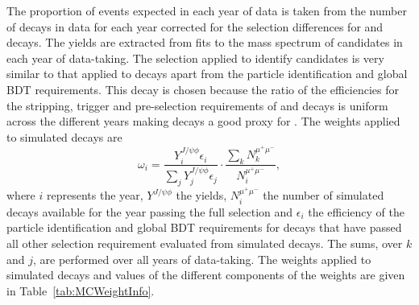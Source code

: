 The proportion of events expected in each year of data is taken from the number of \bsjpsiphi decays in data for each year corrected for the selection differences for \bsmumu and \bsjpsiphi decays. The \bsjpsiphi yields are extracted from fits to the mass spectrum of candidates in each year of data-taking. The selection applied to identify \bsjpsiphi candidates is very similar to that applied to \bsmumu decays apart from the particle identification and global BDT requirements. This decay is chosen because the ratio of the efficiencies for the stripping, trigger and pre-selection requirements of \bsmumu and \bsjpsiphi decays is uniform across the different years making \bsjpsiphi decays a good proxy for \bsmumu. 
The weights applied to simulated \bsmumu decays are
\begin{equation}
\omega_{i}  = \frac{Y_{i}^{J/\psi \phi} \epsilon_{i}}{\displaystyle\sum_{j} Y_{j}^{J/\psi \phi} \epsilon_{j}} \cdot \frac{\displaystyle\sum_{k} N_{k}^{\mu^{+}\mu^{-}}}{N_{i}^{\mu^{+}\mu^{-}}},
\end{equation}
where $i$ represents the year, $Y^{J/\psi \phi}$ the \bsjpsiphi yields, $N^{\mu^{+}\mu^{-}}_{i}$ the number of simulated \bsmumu decays available for the year passing the full \bsmumu selection and $\epsilon_{i}$ the efficiency of the particle identification and global BDT requirements for \bsmumu decays that have passed all other selection requirement evaluated from simulated decays. The sums, over $k$ and $j$, are performed over all years of data-taking. The weights applied to simulated \bsmumu decays and values of the different components of the weights are given in Table~\ref{tab:MCWeightInfo}.

